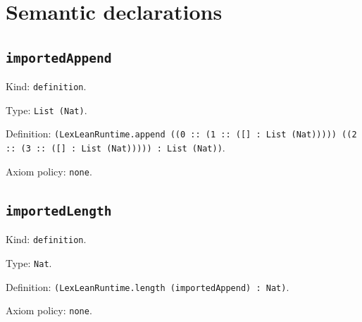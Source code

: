 \documentclass[11pt]{article}
\begin{document}
\section*{Semantic declarations}
\subsection*{\texttt{importedAppend}}
\noindent Kind: \texttt{definition}.\par
\noindent Type: \texttt{List (Nat)}.\par
\noindent Definition: \texttt{(LexLeanRuntime.append ((0 :: (1 :: ([] : List (Nat))))) ((2 :: (3 :: ([] : List (Nat))))) : List (Nat))}.\par
\noindent Axiom policy: \texttt{none}.\par
\subsection*{\texttt{importedLength}}
\noindent Kind: \texttt{definition}.\par
\noindent Type: \texttt{Nat}.\par
\noindent Definition: \texttt{(LexLeanRuntime.length (importedAppend) : Nat)}.\par
\noindent Axiom policy: \texttt{none}.\par
\end{document}
